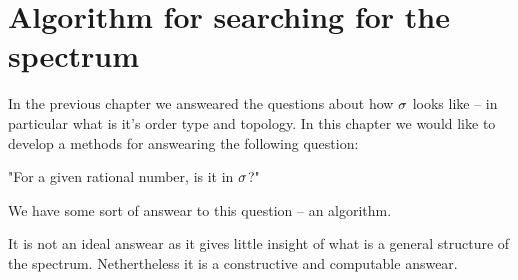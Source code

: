 \chapter{Algorithm for searching for the spectrum}

In the previous chapter we answeared the questions about how ${\sigma}$ looks like -- in particular 
what is it's order type and topology. In this chapter we would like to develop a 
methods for answearing the 
following question: 

"For a given rational number, is it in ${\sigma}$?" 

We have some sort of answear to this question -- an algorithm.

It is not an ideal answear as it gives little insight of what is a general structure 
of the spectrum. Nethertheless it is a constructive and computable answear. 











